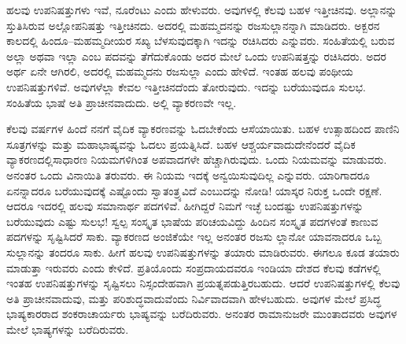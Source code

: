 ಹಲವು ಉಪನಿಷತ್ತುಗಳು ಇವೆ, ನೂರೆಂಟು ಎಂದು ಹೇಳುವರು. ಅವುಗಳಲ್ಲಿ ಕೆಲವು ಬಹಳ ಇತ್ತೀಚಿನವು. ಅಲ್ಲಾನನ್ನು ಸ್ತುತಿಸಿರುವ ಅಲ್ಲೋಪನಿಷತ್ತು ಇತ್ತೀಚಿನದು. ಅದರಲ್ಲಿ ಮಹಮ್ಮದನನ್ನು ರಜಸುಲ್ಲಾನನ್ನಾಗಿ ಮಾಡಿದರು. ಅಕ್ಬರನ ಕಾಲದಲ್ಲಿ ಹಿಂದೂ–ಮಹಮ್ಮದೀಯರ ಸಖ್ಯ ಬೆಳಸುವುದಕ್ಕಾಗಿ ಇದನ್ನು ರಚಿಸಿದರು ಎನ್ನುವರು. ಸಂಹಿತೆಯಲ್ಲಿ ಬರುವ ಅಲ್ಲಾ ಅಥವಾ ಇಲ್ಲಾ ಎಂಬ ಪದವನ್ನು ತೆಗೆದುಕೊಂಡು ಅದರ ಮೇಲೆ ಒಂದು ಉಪನಿಷತ್ತನ್ನು ರಚಿಸಿದರು. ಅದರ ಅರ್ಥ ಏನೇ ಆಗಿರಲಿ, ಅದರಲ್ಲಿ ಮಹಮ್ಮದನು ರಜಸುಲ್ಲಾ ಎಂದು ಹೇಳಿದೆ. ಇಂತಹ ಹಲವು ಪಂಥೀಯ ಉಪನಿಷತ್ತುಗಳಿವೆ. ಅವುಗಳೆಲ್ಲಾ ಕೇವಲ ಇತ್ತೀಚಿನದೆಂದು ತೋರುವುದು. ಇದನ್ನು ಬರೆಯುವುದೂ ಸುಲಭ. ಸಂಹಿತೆಯ ಭಾಷೆ ಅತಿ ಪ್ರಾಚೀನವಾದುದು. ಅಲ್ಲಿ ವ್ಯಾಕರಣವೇ ಇಲ್ಲ.

ಕೆಲವು ವರ್ಷಗಳ ಹಿಂದೆ ನನಗೆ ವೈದಿಕ ವ್ಯಾಕರಣವನ್ನು ಓದಬೇಕೆಂದು ಆಸೆಯಾಯಿತು. ಬಹಳ ಉತ್ಸಾಹದಿಂದ ಪಾಣಿನಿ ಸೂತ್ರಗಳನ್ನು ಮತ್ತು ಮಹಾಭಾಷ್ಯವನ್ನು ಓದಲು ಪ್ರಯತ್ನಿಸಿದೆ. ಬಹಳ ಆಶ್ಚರ್ಯವಾದುದೇನೆಂದರೆ ವೈದಿಕ ವ್ಯಾಕರಣದಲ್ಲಿ\break ಸಾಧಾರಣ ನಿಯಮಗಳಿಗಿಂತ ಅಪವಾದಗಳೇ ಹೆಚ್ಚಾಗಿರುವುದು. ಒಂದು ನಿಯಮವನ್ನು ಮಾಡುವರು. ಅನಂತರ ಒಂದು ವಿನಾಯಿತಿ ತರುವರು. ಈ ನಿಯಮ ಇದಕ್ಕೆ ಅನ್ವಯಿಸುವುದಿಲ್ಲ ಎನ್ನುವರು. ಯಾರಿಗಾದರೂ ಏನನ್ನಾದರೂ ಬರೆಯುವುದಕ್ಕೆ ಎಷ್ಟೊಂದು ಸ್ವಾತಂತ್ರ್ಯವಿದೆ ಎಂಬುದನ್ನು ನೋಡಿ! ಯಾಸ್ಕರ ನಿರುಕ್ತ ಒಂದೇ ರಕ್ಷಣೆ. ಆದರೂ ಇದರಲ್ಲಿ ಹಲವು ಸಮಾನಾರ್ಥ ಪದಗಳಿವೆ. ಹೀಗಿದ್ದರೆ ನಿಮಗೆ ಇಚ್ಛೆ ಬಂದಷ್ಟು ಉಪನಿಷತ್ತುಗಳನ್ನು ಬರೆಯುವುದು ಎಷ್ಟು ಸುಲಭ! ಸ್ವಲ್ಪ ಸಂಸ್ಕೃತ ಭಾಷೆಯ ಪರಿಚಯವಿದ್ದು ಹಿಂದಿನ ಸಂಸ್ಕೃತ ಪದಗಳಂತೆ ಕಾಣುವ ಪದಗಳನ್ನು ಸೃಷ್ಟಿಸಿದರೆ ಸಾಕು. ವ್ಯಾಕರಣದ ಅಂಜಿಕೆಯೇ ಇಲ್ಲ ಅನಂತರ ರಜಸು ಲ್ಲಾನೋ ಯಾವನಾದರೂ ಒಬ್ಬ ಸುಲ್ಲಾನನ್ನು ತಂದರೂ ಸಾಕು. ಹೀಗೆ ಹಲವು ಉಪನಿಷತ್ತುಗಳನ್ನು ತಯಾರು ಮಾಡಿರುವರು. ಈಗಲೂ ಕೂಡ ತಯಾರು ಮಾಡುತ್ತಾ ಇರುವರು ಎಂದು ಕೇಳಿದೆ. ಪ್ರತಿಯೊಂದು ಸಂಪ್ರದಾಯದವರೂ ಇಂಡಿಯಾ ದೇಶದ ಕೆಲವು ಕಡೆಗಳಲ್ಲಿ ಇಂತಹ ಉಪನಿಷತ್ತುಗಳನ್ನು ಸೃಷ್ಟಿಸಲು ನಿಸ್ಸಂದೇಹವಾಗಿ ಪ್ರಯತ್ನಪಡುತ್ತಿರಬಹುದು. ಆದರೆ ಉಪನಿಷತ್ತುಗಳಲ್ಲಿ ಕೆಲವು ಅತಿ ಪ್ರಾಚೀನವಾದುವು, ಮತ್ತು ಪರಿಶುದ್ಧವಾದುವೆಂದು ನಿರ್ವಿವಾದವಾಗಿ ಹೇಳಬಹುದು. ಅವುಗಳ ಮೇಲೆ ಪ್ರಸಿದ್ಧ ಭಾಷ್ಯಕಾರರಾದ ಶಂಕರಾಚಾರ್ಯರು ಭಾಷ್ಯವನ್ನು ಬರೆದಿರುವರು. ಅನಂತರ ರಾಮಾನುಜರೇ ಮುಂತಾದವರು ಅವುಗಳ ಮೇಲೆ ಭಾಷ್ಯಗಳನ್ನು ಬರೆದಿರುವರು.

